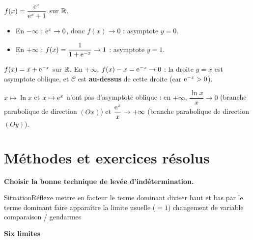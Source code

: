 \begin{exemple}
	$f(x)=\dfrac{\mathrm{e}^x}{\mathrm{e}^x+1}$ sur $\mathbb{R}$.
	\begin{itemize}[label=\textbullet]
		\item En $-\infty$ : $\mathrm{e}^x\to 0$, donc $f(x)\to 0$ : asymptote $y=0$.
		\item En $+\infty$ : $f(x)=\dfrac{1}{1+\mathrm{e}^{-x}}\to 1$ : asymptote $y=1$.
	\end{itemize}
\end{exemple}

\begin{exemple}
	$f(x)=x+\mathrm{e}^{-x}$ sur $\mathbb{R}$. En $+\infty$, $f(x)-x=\mathrm{e}^{-x}\to 0$ :
	la droite $y=x$ est asymptote oblique, et $\mathcal C$ est \textbf{au-dessus}
	de cette droite (car $\mathrm{e}^{-x}>0$).
\end{exemple}

\begin{remarque}
	$x\mapsto\ln x$ et $x\mapsto\mathrm{e}^x$ n'ont pas d'asymptote oblique : en
	$+\infty$, $\dfrac{\ln x}{x}\to 0$ (branche parabolique de direction
	$(Ox)$) et $\dfrac{\mathrm{e}^x}{x}\to+\infty$ (branche parabolique de direction
	$(Oy)$).
\end{remarque}


\section{Méthodes et exercices résolus}

\begin{methode}
	\textbf{Choisir la bonne technique de levée d'indétermination.}
	\begin{tabmethode}[0.45]{Situation}{Réflexe}
		      {mettre en facteur le terme dominant}
		      {diviser haut et bas par le terme dominant}
		      {faire apparaître la limite usuelle ($=1$)}
		      {changement de variable}
		      {comparaison / gendarmes}
	\end{tabmethode}
\end{methode}

\exerciceresolu
\textbf{Six limites}

